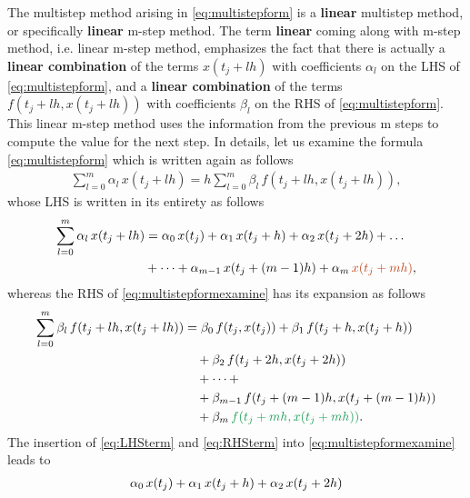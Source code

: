 \documentclass[12pt]{article}
\begin{document}
\begin{observationboxed}
	The multistep method arising in 
	\eqref{eq:multistepform}
	is a \textbf{linear} multistep method, or specifically 
	\textbf{linear} m-step method.
	The term \textbf{linear} coming along with m-step method,
	i.e. linear m-step method, emphasizes the fact that
	there is actually a \textbf{linear combination} of the terms $x(t_j+lh)$ with coefficients $\alpha_l$
	on the LHS of \eqref{eq:multistepform}, and 
	a \textbf{linear combination} of the terms $f(t_j+lh,x(t_j+lh))$
	with coefficients $\beta_l$
	on the RHS of \eqref{eq:multistepform}. This linear m-step method 
	uses the information from the previous m steps to compute the value for the next step. 
	In details, let us examine the formula \eqref{eq:multistepform}
	which is written again as follows
	\begin{align}
		\label{eq:multistepformexamine}
		\sum_{l=0}^{{m}}\alpha_l\,x(t_j+lh) = h\sum_{l=0}^{m}\beta_l\,f(t_j+lh,x(t_j+lh)),
	\end{align}
	whose LHS is written in its entirety as follows
	\begin{align}
		\label{eq:LHSterm}
		\sum_{l=0}^{{m}}\alpha_l\,x(t_j+lh) 
		 & = 
		\alpha_0\,x{(t_j)} 
		+ \alpha_1\,x{(t_j+h)} 
		+ \alpha_2\,x{(t_j+2h)}
		+ \dots \notag \\
		 & 
		+ \dots
		+ \alpha_{m-1}\,x{(t_j+(m-1)h)} 
		+ \alpha_m\,\textcolor{Bittersweet}{x{(t_j+mh)}},
	\end{align}
	whereas the RHS of \eqref{eq:multistepformexamine} has its expansion as follows
	\begin{align}
		\label{eq:RHSterm}
		\sum_{l=0}^{m}\beta_l\,f(t_j+lh,x(t_j+lh))
		 & =  
		\beta_0\,f(t_j,x(t_j)) 
		+ \beta_1\,f(t_j+h,x(t_j+h))
		\notag    \\
		 & \quad 
		+ \beta_2\,f(t_j+2h,x(t_j+2h))
		\notag    \\
		 & \quad 
		+ \dots + 
		\notag    \\
		 & \quad 
		+ \beta_{m-1}\,f(t_j+(m-1)h,x(t_j+(m-1)h)) 
		\notag    \\
		 & \quad 
		+ \beta_{m}\,\textcolor{ForestGreen}{f(t_j+mh,x(t_j+mh))}.
	\end{align}
	The insertion of \eqref{eq:LHSterm} and \eqref{eq:RHSterm}
	into \eqref{eq:multistepformexamine} leads to
	\begin{align}
		\label{eq:assembling}
		 & \alpha_0\,x{(t_j)} 
		+ \alpha_1\,x{(t_j+h)}  
		+ \alpha_2\,x{(t_j+2h)} 
		\notag                             \\

\end{align}
\end{observationboxed}
\end{document}
